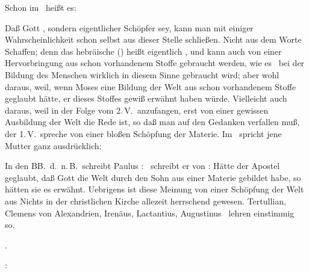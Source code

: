 \begin{aufza}
\item Schon im \ heißt es: 
\item Daß Gott , sondern eigentlicher Schöpfer sey, kann man mit einiger Wahrscheinlichkeit schon selbst aus dieser Stelle schließen. Nicht aus dem Worte Schaffen; denn das hebräische  () heißt eigentlich , und kann auch von einer Hervorbringung aus schon vorhandenem Stoffe gebraucht werden, wie es \ bei der Bildung des Menschen wirklich in diesem Sinne gebraucht wird; aber wohl daraus, weil, wenn Moses eine Bildung der Welt aus schon vorhandenem Stoffe geglaubt hätte, er dieses Stoffes gewiß erwähnt haben würde. Vielleicht auch daraus, weil in der Folge vom 2.\,V.\ anzufangen, erst von einer gewissen Ausbildung der Welt die Rede ist, so daß man auf den Gedanken verfallen muß, der 1.\,V.\ spreche von einer bloßen Schöpfung der Materie. Im \ spricht jene Mutter ganz ausdrücklich: \par
In den BB.\ d.\ n.\,B.\ schreibt Paulus :  \ schreibt er von :  Hätte der Apostel geglaubt, daß Gott die Welt durch den Sohn aus einer Materie gebildet habe, so hätten sie es erwähnt. Uebrigens ist diese Meinung von einer Schöpfung der Welt aus Nichts in der christlichen Kirche allezeit herrschend gewesen. Tertullian, Clemens von Alexandrien, Irenäus, Lactantius, Augustinus \uA\ lehren einstimmig so.~
\item {}.\par
{}:\par
{}
\end{aufza}
